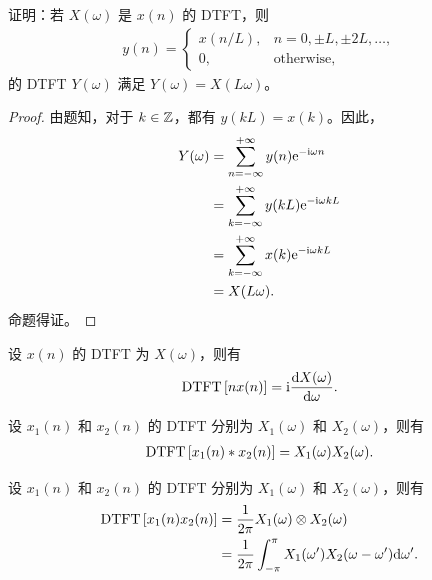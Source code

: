 \begin{exercise}
    证明：若 $X(\omega)$ 是 $x(n)$ 的 DTFT，则
    \begin{align*}
        y(n) = \begin{cases}
            x(n / L), & n = 0, \pm L, \pm 2L, \ldots, \\
            0, & \text{otherwise},
        \end{cases}
    \end{align*}
    的 DTFT $Y(\omega)$ 满足 $Y(\omega) = X(L \omega)$。
\end{exercise}

\begin{proof}
    由题知，对于 $k \in \mathbb{Z}$，都有 $y(kL) = x(k)$。因此，
    \begin{align*}
        Y(\omega) & = \sum_{n = -\infty}^{+\infty}y(n)\mathrm{e}^{-\mathrm{i}\omega n} \\
        & = \sum_{k = -\infty}^{+\infty}y(k L)\mathrm{e}^{-\mathrm{i}\omega kL} \\
        & = \sum_{k = -\infty}^{+\infty}x(k)\mathrm{e}^{-\mathrm{i}\omega kL} \\
        & = X(L\omega).
    \end{align*}
    命题得证。
\end{proof}

\begin{property}
    设 $x(n)$ 的 DTFT 为 $X(\omega)$，则有
    \begin{align*}
        \mathrm{DTFT}\left[n x(n)\right] = \mathrm{i}\frac{\mathrm{d}X(\omega)}{\mathrm{d}\omega}.
    \end{align*}
\end{property}

\begin{property}
    设 $x_1(n)$ 和 $x_2(n)$ 的 DTFT 分别为 $X_1(\omega)$ 和 $X_2(\omega)$，则有
    \begin{align*}
        \mathrm{DTFT}\left[x_1(n) * x_2(n)\right] = X_1(\omega)X_2(\omega).
    \end{align*}
\end{property}

\begin{property}
    设 $x_1(n)$ 和 $x_2(n)$ 的 DTFT 分别为 $X_1(\omega)$ 和 $X_2(\omega)$，则有
    \begin{align*}
        \mathrm{DTFT}\left[x_1(n)x_2(n)\right] & = \frac{1}{2\pi}X_1(\omega) \otimes X_2(\omega) \\
        & = \frac{1}{2\pi}\int_{-\pi}^{\pi}X_1(\omega')X_2(\omega - \omega')\mathrm{d}\omega'.
    \end{align*}
\end{property}

